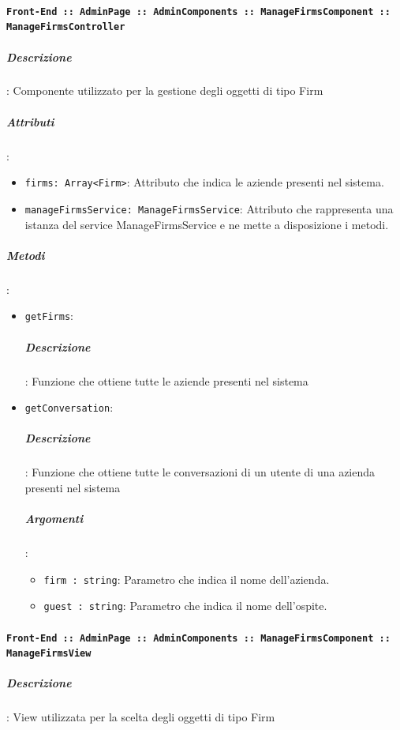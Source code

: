 \documentclass[../DefinizioneDiProdotto_v3.0.0.tex]{subfiles}
\begin{document}
				\paragraph{\texttt{Front-End :: AdminPage :: AdminComponents :: ManageFirmsComponent :: ManageFirmsController}}
					\subparagraph{Descrizione}: Componente utilizzato per la gestione degli oggetti di tipo Firm
					\subparagraph{Attributi}:
					\begin{itemize}
						\item \texttt{firms: Array<Firm>}: Attributo che indica le aziende presenti nel sistema.
						\item \texttt{manageFirmsService: ManageFirmsService}: Attributo che rappresenta una istanza del service ManageFirmsService e ne mette a disposizione i metodi.
					\end{itemize}
					\subparagraph{Metodi}:
					\begin{itemize}
						\item \texttt{getFirms}:
							\subparagraph{Descrizione}: Funzione che ottiene tutte le aziende presenti nel sistema
						\item \texttt{getConversation}:
						\subparagraph{Descrizione}: Funzione che ottiene tutte le conversazioni di un utente di una azienda presenti nel sistema
						\subparagraph{Argomenti}:
						\begin{itemize}
							\item \texttt{firm : string}: Parametro che indica il nome dell'azienda.
							\item \texttt{guest : string}: Parametro che indica il nome dell'ospite.
						\end{itemize}
					\end{itemize}

				\paragraph{\texttt{Front-End :: AdminPage :: AdminComponents :: ManageFirmsComponent :: ManageFirmsView}}
					\subparagraph{Descrizione}: View utilizzata per la scelta degli oggetti di tipo Firm


	\newpage
\end{document}
